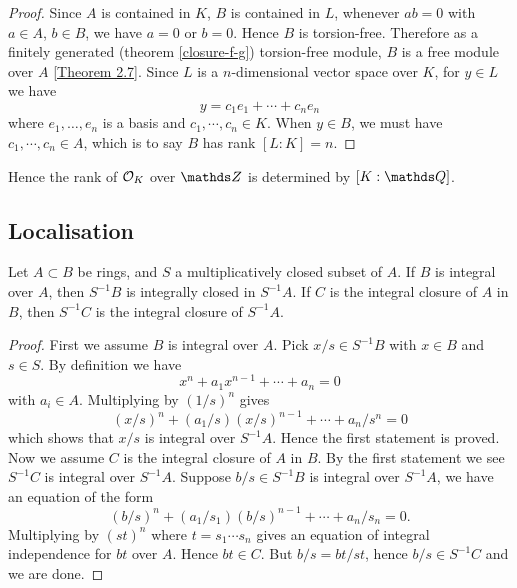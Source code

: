 			\begin{proof}
				Since $A$ is contained in $K$, $B$ is contained in $L$, whenever $ab=0$ with $a \in A$, $b \in B$, we have $a=0$ or $b=0$. Hence $B$ is torsion-free. Therefore as a finitely generated (theorem \ref{closure-f-g}) torsion-free module, $B$ is a free module over $A$ \href{http://du.ac.in/du/uploads/departments/mathematics/study-material/MMATH18-201\%20_MT_PID.pdf}{[Theorem 2.7]}. Since $L$ is a $n$-dimensional vector space over $K$, for $y \in L$ we have
				\[
					y = c_1e_1+\cdots+c_ne_n
				\]
				where $e_1,\dots,e_n$ is a basis and $c_1,\cdots,c_n \in K$. When $y \in B$, we must have $c_1,\cdots,c_n \in A$, which is to say $B$ has rank $[L:K]=n$.
			\end{proof}
			Hence the rank of $\mathcal{O}_K$ over $\Z$ is determined by $[K:\Q]$.
		
		\subsection{Localisation}
		
			\begin{theorem}\label{int-clo-loc}
				Let $A \subset B$ be rings, and $S$ a multiplicatively closed subset of $A$. If $B$ is integral over $A$, then $S^{-1}B$ is integrally closed in $S^{-1}A$. If $C$ is the integral closure of $A$ in $B$, then $S^{-1}C$ is the integral closure of $S^{-1}A$. 
			\end{theorem}
		
			\begin{proof}
				First we assume $B$ is integral over $A$. Pick $x/s \in S^{-1}B$ with $x \in B$ and $s \in S$. By definition we have
				\[
					x^n + a_1x^{n-1}+\cdots + a_n = 0
				\]
				with $a_i \in A$. Multiplying by $(1/s)^n$ gives
				\[
					(x/s)^n + (a_1/s)(x/s)^{n-1}+\cdots+a_n/s^n = 0
				\]
				which shows that $x/s$ is integral over $S^{-1}A$. Hence the first statement is proved. \\
				Now we assume $C$ is the integral closure of $A$ in $B$. By the first statement we see $S^{-1}C$ is integral over $S^{-1}A$. Suppose $b/s \in S^{-1}B$ is integral over $S^{-1}A$, we have an equation of the form
				\[
					(b/s)^n+(a_1/s_1)(b/s)^{n-1}+\cdots+a_n/s_n=0.
				\]
				Multiplying by $(st)^n$ where $t=s_1\cdots s_n$ gives an equation of integral independence for $bt$ over $A$. Hence $bt \in C$. But $b/s = bt/st$, hence $b/s \in S^{-1}C$ and we are done. 
			\end{proof}
		
